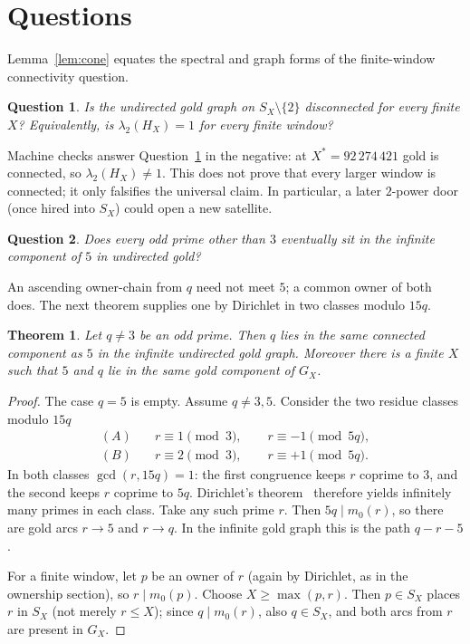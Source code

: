 \documentclass[11pt,a4paper]{article}
\newtheorem{theorem}{Theorem}
\newtheorem{question}{Question}
\begin{document}
\section{Questions}

Lemma~\ref{lem:cone} equates the spectral and graph forms of the finite-window connectivity question.

\begin{question}
\label{q:windows}
Is the undirected gold graph on \(S_X\setminus\{2\}\) disconnected for every finite \(X\)?
Equivalently, is \(\lambda_2(H_X)=1\) for every finite window?
\end{question}

Machine checks answer Question~\ref{q:windows} in the negative: at \(X^*=92\,274\,421\) gold is connected, so \(\lambda_2(H_X)\neq 1\).
This does not prove that every larger window is connected; it only falsifies the universal claim.
In particular, a later \(2\)-power door (once hired into \(S_X\)) could open a new satellite.

\begin{question}
\label{q:infinite}
Does every odd prime other than \(3\) eventually sit in the infinite component of \(5\) in undirected gold?
\end{question}

An ascending owner-chain from \(q\) need not meet \(5\); a common owner of both does.
The next theorem supplies one by Dirichlet in two classes modulo \(15q\).

\begin{theorem}
\label{thm:bridge}
Let \(q\neq 3\) be an odd prime.
Then \(q\) lies in the same connected component as \(5\) in the infinite undirected gold graph.
Moreover there is a finite \(X\) such that \(5\) and \(q\) lie in the same gold component of \(G_X\).
\end{theorem}

\begin{proof}
The case \(q=5\) is empty.
Assume \(q\neq 3,5\).
Consider the two residue classes modulo \(15q\)
\[
\begin{aligned}
(A)&\quad r\equiv 1\pmod{3},\qquad r\equiv -1\pmod{5q},\\
(B)&\quad r\equiv 2\pmod{3},\qquad r\equiv +1\pmod{5q}.
\end{aligned}
\]
In both classes \(\gcd(r,15q)=1\): the first congruence keeps \(r\) coprime to \(3\), and the second keeps \(r\) coprime to \(5q\).
Dirichlet's theorem~\cite{Dirichlet} therefore yields infinitely many primes in each class.
Take any such prime \(r\).
Then \(5q\mid m_0(r)\), so there are gold arcs \(r\to 5\) and \(r\to q\).
In the infinite gold graph this is the path \(q{-}r{-}5\).

For a finite window, let \(p\) be an owner of \(r\) (again by Dirichlet, as in the ownership section), so \(r\mid m_0(p)\).
Choose \(X\ge\max(p,r)\).
Then \(p\in S_X\) places \(r\) in \(S_X\) (not merely \(r\le X\)); since \(q\mid m_0(r)\), also \(q\in S_X\), and both arcs from \(r\) are present in \(G_X\).
\end{proof}
\end{document}
